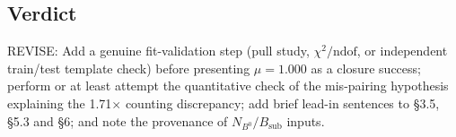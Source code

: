 \documentclass[11pt]{article}
\begin{document}
\subsection*{Verdict}

REVISE: Add a genuine fit-validation step (pull study,
$\chi^2/\mathrm{ndof}$, or independent train/test template check) before
presenting $\mu=1.000$ as a closure success; perform or at least attempt
the quantitative check of the mis-pairing hypothesis explaining the
1.71$\times$ counting discrepancy; add brief lead-in sentences to \S3.5,
\S5.3 and \S6; and note the provenance of $N_{B^0}/B_{\mathrm{sub}}$
inputs.
\end{document}
